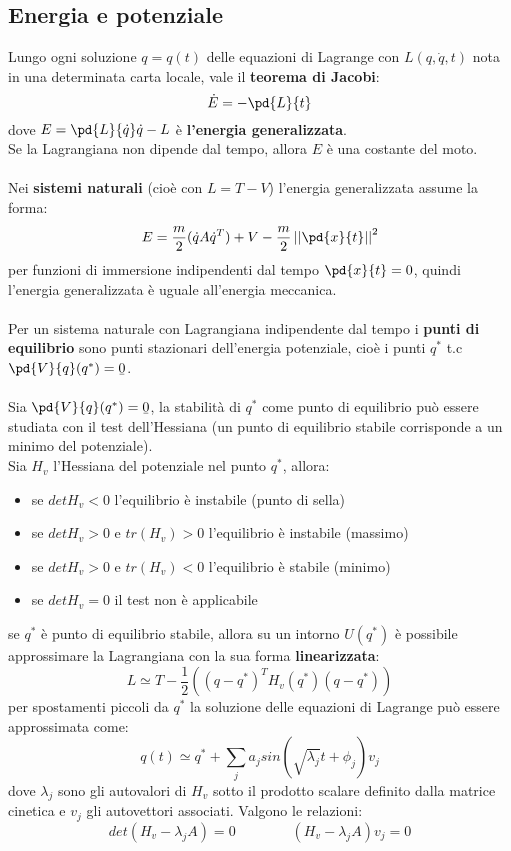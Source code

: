 \documentclass{article}
\begin{document}
\subsection{Energia e potenziale}
Lungo ogni soluzione $q=q(t)$ delle equazioni di Lagrange con $L(q,\dot q, t)$ nota in una determinata carta locale, vale il \textbf{teorema di Jacobi}:
$$\dot E=-\pd{L}{t}$$
dove $E=\pd{L}{\dot q}\dot q-L$ è \textbf{l'energia generalizzata}.\\
Se la Lagrangiana non dipende dal tempo, allora $E$ è una costante del moto.\\\\
Nei \textbf{sistemi naturali} (cioè con $L=T-V$) l'energia generalizzata assume la forma:
$$ E=\frac{m}{2}(\dot q A \dot q^T)+V-\frac{m}{2}\left|\left|\pd{x}{t}\right|\right|^2$$
per funzioni di immersione indipendenti dal tempo $\pd{x}{t}=0$, quindi l'energia generalizzata è uguale all'energia meccanica.\\\\
Per un sistema naturale con Lagrangiana indipendente dal tempo i \textbf{punti di equilibrio} sono punti stazionari dell'energia potenziale, cioè i punti $q^*$ t.c $\pd{V}{q}(q^*)=\ubar{0}$.\\\\
Sia $\pd{V}{q}(q^*)=\ubar{0}$, la stabilità di $q^*$ come punto di equilibrio può essere studiata con il test dell'Hessiana (un punto di equilibrio stabile corrisponde a un minimo del potenziale).\\
Sia $H_v$ l'Hessiana del potenziale nel punto $q^*$, allora:
\begin{itemize}
    \item se $det H_v<0$ l'equilibrio è instabile (punto di sella)
    \item se $det H_v>0$ e $tr(H_v)>0$ l'equilibrio è instabile (massimo)
    \item se $det H_v>0$ e $tr(H_v)<0$ l'equilibrio è stabile (minimo)
    \item se $det H_v=0$ il test non è applicabile
\end{itemize}
se $q^*$ è punto di equilibrio stabile, allora su un intorno $U(q^*)$ è possibile approssimare la Lagrangiana con la sua forma \textbf{linearizzata}:
$$ L\simeq T-\frac{1}{2}((q-q^*)^TH_v(q^*)(q-q^*)) $$
per spostamenti piccoli da $q^*$ la soluzione delle equazioni di Lagrange può essere approssimata come:
$$ q(t)\simeq q^*+\sum_ja_jsin(\sqrt{\lambda_j}t+\phi_j)v_j $$
dove $\lambda_j$ sono gli autovalori di $H_v$ sotto il prodotto scalare definito dalla matrice cinetica e $v_j$ gli autovettori associati. Valgono le relazioni:
$$ det(H_v-\lambda_jA)=0 \qquad\qquad (H_v-\lambda_jA)v_j=0 $$
\end{document}
